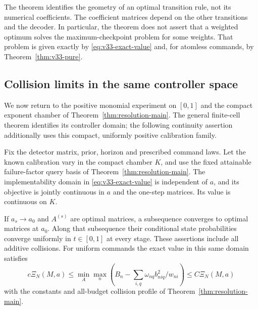 The theorem identifies the geometry of an optimal transition rule,
not its numerical coefficients. The coefficient matrices depend on
the other transitions and the decoder. In particular, the theorem
does not assert that a weighted optimum solves the maximum-checkpoint
problem for some weights. That problem is given exactly by
\eqref{eq:v33-exact-value} and, for atomless commands, by
Theorem~\ref{thm:v33-pure}.

\subsection{Collision limits in the same controller space}
We now return to the positive monomial experiment on $[0,1]$ and
the compact exponent chamber of Theorem~\ref{thm:resolution-main}.
The general finite-cell theorem identifies its controller domain;
the following continuity assertion additionally uses this compact,
uniformly positive calibration family.
\begin{theorem}\label{thm:v33-collision}
Fix the detector matrix, prior, horizon and prescribed command laws.
Let the known calibration vary in the compact chamber $K$, and use
the fixed attainable failure-factor query basis of
Theorem~\ref{thm:resolution-main}. The implementability domain in
\eqref{eq:v33-exact-value} is independent of $a$, and its objective
is jointly continuous in $a$ and the one-step matrices. Its value
is continuous on $K$.

If $a_s\to a_0$ and $A^{(s)}$ are optimal matrices, a subsequence
converges to optimal matrices at $a_0$. Along that subsequence their
conditional state probabilities converge uniformly in $t\in[0,1]$
at every stage. These assertions include all additive collisions.
For uniform commands the exact value in this same domain satisfies
\[
 c\Xi_N(M,a)\le
    \min_A\max_n\left(B_n-\sum_{i,q}\omega_{nq}b_{niq}^2/w_{ni}\right)
           \le C\Xi_N(M,a)
\]
with the constants and all-budget collision profile of
Theorem~\ref{thm:resolution-main}.
\end{theorem}
